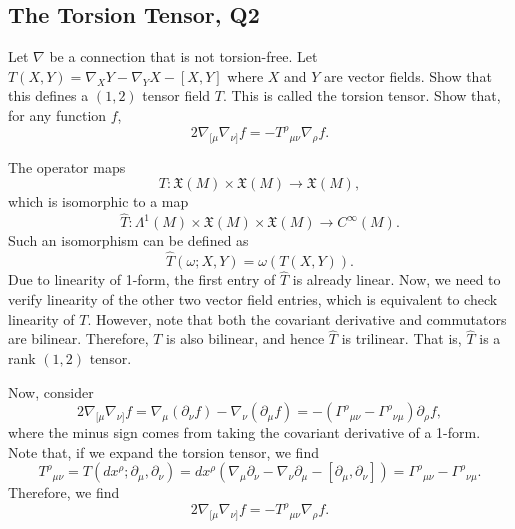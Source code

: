 \subsection{The Torsion Tensor, Q2}

Let $\nabla$ be a connection that is not torsion-free. Let $T(X,Y) = \nabla_X Y - \nabla_Y X - [X,Y]$ where $X$ and $Y$ are vector fields. Show that this defines a $(1,2)$ tensor field $T$. This is called the torsion tensor. Show that, for any function $f$,
\begin{equation}
    2\nabla_{[\mu}\nabla_{\nu]}f = -T^\rho{}_{\mu\nu}\nabla_\rho f.
\end{equation}
\begin{solution}
        The operator maps
        \begin{equation}
            T: \mathfrak{X}(M)\times\mathfrak{X}(M) \to \mathfrak{X}(M),
        \end{equation}
        which is isomorphic to a map
        \begin{equation}
            \hat{T}: \Lambda^1(M)\times \mathfrak{X}(M)\times\mathfrak{X}(M) \to C^\infty(M).
        \end{equation}
        Such an isomorphism can be defined as
        \begin{equation}
            \hat{T}(\omega;X,Y) = \omega(T(X,Y)).
        \end{equation}
        Due to linearity of 1-form, the first entry of $\hat{T}$ is already linear. Now, we need to verify linearity of the other two vector field entries, which is equivalent to check linearity of $T$. However, note that both the covariant derivative and commutators are bilinear. Therefore, $T$ is also bilinear, and hence $\hat{T}$ is trilinear. That is, $\hat{T}$ is a rank $(1,2)$ tensor.

        Now, consider 
        \begin{equation}
            2\nabla_{[\mu}\nabla_{\nu]}f = \nabla_\mu(\partial_\nu f) - \nabla_\nu(\partial_\mu f) = -(\Gamma^\rho{}_{\mu\nu} - \Gamma^\rho{}_{\nu\mu})\partial_\rho f,
        \end{equation}
        where the minus sign comes from taking the covariant derivative of a 1-form.
        Note that, if we expand the torsion tensor, we find
        \begin{equation}
            T^{\rho}{}_{\mu\nu} = T(dx^\rho ; \partial _\mu, \partial_\nu) = dx^\rho(\nabla_\mu \partial_\nu - \nabla_\nu \partial_\mu - [\partial_\mu, \partial_\nu]) = \Gamma^\rho{}_{\mu\nu} - \Gamma^\rho{}_{\nu\mu}.
        \end{equation}
        Therefore, we find
        \begin{equation}
            2\nabla_{[\mu}\nabla_{\nu]}f = -T^\rho{}_{\mu\nu}\nabla_\rho f.
        \end{equation}
\end{solution}

